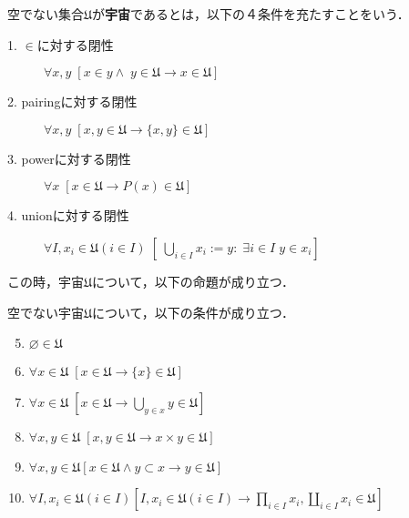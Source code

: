 \documentclass[uplatex, dvipdfmx]{jsreport}
\begin{document}
\begin{definition}\label{grothendieck}
    空でない集合$\mathfrak{U}$が\textbf{宇宙}であるとは，以下の４条件を充たすことをいう．
    \begin{description}
        \item[1. $\in$に対する閉性] $\forall x,y \; [x\in y \wedge \; y\in \mathfrak{U} \rightarrow x\in \mathfrak{U}]$
        \item[2. pairingに対する閉性] $\forall x,y \; [x,y\in \mathfrak{U} \rightarrow \{ x,y\} \in \mathfrak{U}]$
        \item[3. powerに対する閉性] $\forall x \; [x\in\mathfrak{U} \rightarrow P(x) \in \mathfrak{U}]$
        \item[4. unionに対する閉性] $\forall I,x_i \in \mathfrak{U}(i\in I) \; [\; \bigcup_{i\in I} x_i := {y:\; \exists i\in I \; y\in x_i}]$
    \end{description}
\end{definition}

この時，宇宙$\mathfrak{U}$について，以下の命題が成り立つ．
\begin{proposition}空でない宇宙$\mathfrak{U}$について，以下の条件が成り立つ．
    \begin{enumerate}\setcounter{enumi}{4}
        \item $\varnothing\in\mathfrak{U}$
        \item $\forall x\in\mathfrak{U} \; [x\in\mathfrak{U}\rightarrow \{ x \} \in \mathfrak{U}]$
        \item $\forall x\in\mathfrak{U} \; [x\in\mathfrak{U}\rightarrow \bigcup_{y\in x}y\in\mathfrak{U}]$
        \item $\forall x,y\in\mathfrak{U} \; [x,y \in\mathfrak{U}\rightarrow x\times y\in\mathfrak{U}]$
        \item $\forall x,y\in\mathfrak{U} [x\in\mathfrak{U} \wedge y\subset x \rightarrow y\in\mathfrak{U}]$
        \item $\forall I,x_i\in\mathfrak{U}(i\in I) \left[I,x_i\in\mathfrak{U}(i\in I)\rightarrow \prod_{i\in I}x_i , \coprod_{i\in I}x_i\in\mathfrak{U}\right]$
    \end{enumerate}
\end{proposition}
\end{document}
